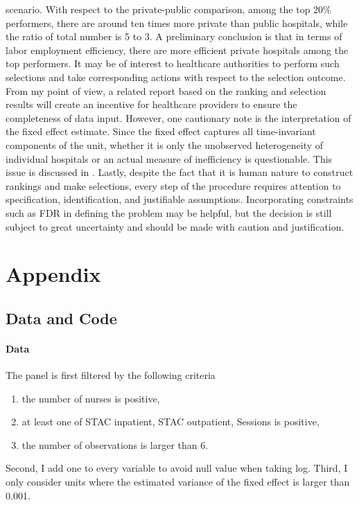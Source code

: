 \documentclass[12pt]{article}
\begin{document}
scenario. With respect to the private-public comparison, among the top 20\%
performers, there are around ten times more private than public hospitals,
while the ratio of total number is 5 to 3. A preliminary conclusion is that in
terms of labor employment efficiency, there are more efficient private
hospitals among the top performers. It may be of interest to healthcare
authorities to perform such selections and take corresponding actions with
respect to the selection outcome. From my point of view, a related report based
on the ranking and selection results will create an incentive for healthcare
providers to ensure the completeness of data input. However, one cautionary
note is the interpretation of the fixed effect estimate. Since the fixed effect
captures all time-invariant components of the unit, whether it is only the
unobserved heterogeneity of individual hospitals or an actual measure of
inefficiency is questionable. This issue is discussed in
\citet{greene2005fixed}. Lastly, despite the fact that it is human nature to
construct rankings and make selections, every step of the procedure requires
attention to specification, identification, and justifiable assumptions.
Incorporating constraints such as FDR in defining the problem may be helpful,
but the decision is still subject to great uncertainty and should be made with
caution and justification.

\pagebreak
\newpage


\appendix
\section{Appendix}
\subsection{Data and Code}

\paragraph{Data} The panel is first filtered by the following criteria
\begin{enumerate}
    \item the number of nurses is positive,
    \item at least one of STAC inpatient, STAC outpatient, Sessions is positive,
    \item the number of observations is larger than 6.
\end{enumerate}
Second, I add one to every variable to avoid null value when taking log. Third, I only consider units where the estimated variance of the fixed effect is larger than 0.001.
\end{document}
